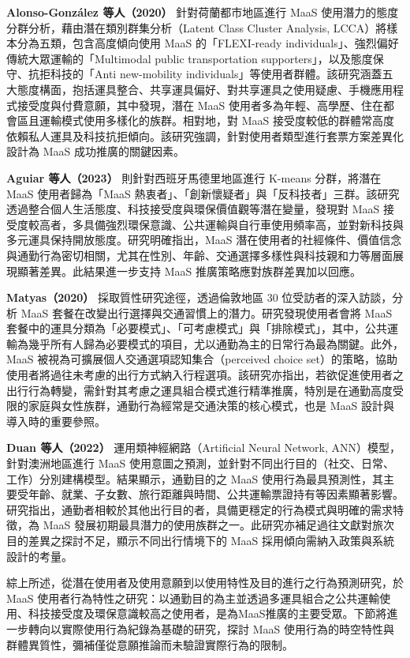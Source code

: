 \textbf{Alonso-González 等人（2020）} 針對荷蘭都市地區進行 MaaS
使用潛力的態度分群分析，藉由潛在類別群集分析（Latent Class Cluster
Analysis, LCCA）將樣本分為五類，包含高度傾向使用 MaaS 的「FLEXI-ready
individuals」、強烈偏好傳統大眾運輸的「Multimodal public transportation
supporters」，以及態度保守、抗拒科技的「Anti new-mobility
individuals」等使用者群體。該研究涵蓋五大態度構面，抱括運具整合、共享運具偏好、對共享運具之使用疑慮、手機應用程式接受度與付費意願，其中發現，潛在
MaaS
使用者多為年輕、高學歷、住在都會區且運輸模式使用多樣化的族群。相對地，對
MaaS
接受度較低的群體常高度依賴私人運具及科技抗拒傾向。該研究強調，針對使用者類型進行套票方案差異化設計為
MaaS 成功推廣的關鍵因素。

\textbf{Aguiar 等人（2023）} 則針對西班牙馬德里地區進行 K-means
分群，將潛在 MaaS 使用者歸為「MaaS
熱衷者」、「創新懷疑者」與「反科技者」三群。該研究透過整合個人生活態度、科技接受度與環保價值觀等潛在變量，發現對
MaaS
接受度較高者，多具備強烈環保意識、公共運輸與自行車使用頻率高，並對新科技與多元運具保持開放態度。研究明確指出，MaaS
潛在使用者的社經條件、價值信念與通勤行為密切相關，尤其在性別、年齡、交通選擇多樣性與科技親和力等層面展現顯著差異。此結果進一步支持
MaaS 推廣策略應對族群差異加以回應。

\textbf{Matyas（2020）} 採取質性研究途徑，透過倫敦地區 30
位受訪者的深入訪談，分析 MaaS
套餐在改變出行選擇與交通習慣上的潛力。研究發現使用者會將 MaaS
套餐中的運具分類為「必要模式」、「可考慮模式」與「排除模式」，其中，公共運輸為幾乎所有人歸為必要模式的項目，尤以通勤為主的日常行為最為關鍵。此外，MaaS
被視為可擴展個人交通選項認知集合（perceived choice
set）的策略，協助使用者將過往未考慮的出行方式納入行程選項。該研究亦指出，若欲促進使用者之出行行為轉變，需針對其考慮之運具組合模式進行精準推廣，特別是在通勤高度受限的家庭與女性族群，通勤行為經常是交通決策的核心模式，也是
MaaS 設計與導入時的重要參照。

\textbf{Duan 等人（2022）} 運用類神經網路（Artificial Neural Network,
ANN）模型，針對澳洲地區進行 MaaS
使用意圖之預測，並針對不同出行目的（社交、日常、工作）分別建構模型。結果顯示，通勤目的之
MaaS
使用行為最具預測性，其主要受年齡、就業、子女數、旅行距離與時間、公共運輸票證持有等因素顯著影響。研究指出，通勤者相較於其他出行目的者，具備更穩定的行為模式與明確的需求特徵，為
MaaS
發展初期最具潛力的使用族群之一。此研究亦補足過往文獻對旅次目的差異之探討不足，顯示不同出行情境下的
MaaS 採用傾向需納入政策與系統設計的考量。

綜上所述，從潛在使用者及使用意願到以使用特性及目的進行之行為預測研究，於
MaaS
使用者行為特性之研究：以通勤目的為主並透過多運具組合之公共運輸使用、科技接受度及環保意識較高之使用者，是為MaaS推廣的主要受眾。下節將進一步轉向以實際使用行為紀錄為基礎的研究，探討
MaaS
使用行為的時空特性與群體異質性，彌補僅從意願推論而未驗證實際行為的限制。

